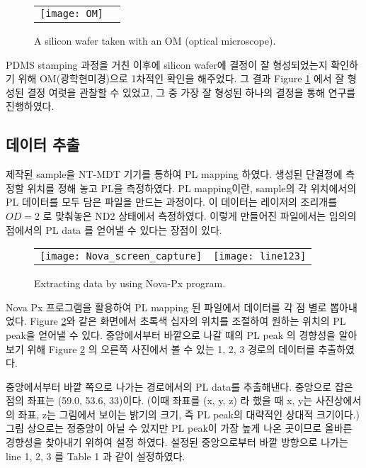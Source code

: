 \begin{figure}[H]
	\begin{center}
		\begin{tabular}{cc}
			\texttt{[image: OM]}
		\end{tabular}
	\end{center}
	\caption{A silicon wafer taken with an OM (optical microscope).}
	\label{fig:om}  
\end{figure}
PDMS stamping 과정을 거친 이후에 silicon wafer에 결정이 잘 형성되었는지 확인하기 위해 OM(광학현미경)으로 1차적인 확인을 해주었다. 그 결과 Figure \ref{fig:om} 에서 잘 형성된 결정 여럿을 관찰할 수 있었고, 그 중 가장 잘 형성된 하나의 결정을 통해 연구를 진행하였다.

\subsection{데이터 추출}
제작된 sample을 NT-MDT 기기를 통하여 PL mapping 하였다. 생성된 단결정에 측정할 위치를 정해 놓고 PL을 측정하였다.  PL mapping이란, sample의 각 위치에서의 PL 데이터를 모두 담은 파일을 만드는 과정이다. 이 데이터는 레이저의 조리개를 $OD = 2$ 로 맞춰놓은 ND2 상태에서 측정하였다. 이렇게 만들어진 파일에서는 임의의 점에서의 PL data 를 얻어낼 수 있다는 장점이 있다.
\begin{figure}[H]
	\begin{center}
		\begin{tabular}{cc}
			\texttt{[image: Nova\_screen\_capture]}&
			\texttt{[image: line123]}
		\end{tabular}
	\end{center}
	\caption{Extracting data by using Nova-Px program.}
	\label{fig:nova}  
\end{figure}
Nova Px 프로그램을 활용하여 PL mapping 된 파일에서 데이터를 각 점 별로 뽑아내었다. Figure \ref{fig:nova}와 같은 화면에서 초록색 십자의 위치를 조절하여 원하는 위치의 PL peak을 얻어낼 수 있다. 중앙에서부터 바깥으로 나갈 때의 PL peak 의 경향성을 알아보기 위해 Figure \ref{fig:nova} 의 오른쪽 사진에서 볼 수 있는 1, 2, 3 경로의 데이터를 추출하였다.

중앙에서부터 바깥 쪽으로 나가는 경로에서의 PL data를 추출해낸다. 중앙으로 잡은 점의 좌표는 (59.0, 53.6, 33)이다. (이때 좌표를 (x, y, z) 라 했을 때 x, y는 사진상에서의 좌표, z는 그림에서 보이는 밝기의 크기, 즉 PL peak의 대략적인 상대적 크기이다.) 그림 상으로는 정중앙이 아닐 수 있지만 PL peak이 가장 높게 나온 곳이므로 올바른 경향성을 찾아내기 위하여 설정 하였다. 설정된 중앙으로부터 바깥 방향으로 나가는 line 1, 2, 3 를 Table 1 과 같이 설정하였다.

